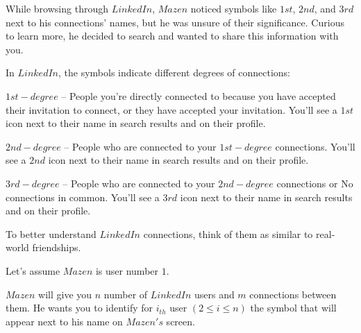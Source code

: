 While browsing through $LinkedIn$, $Mazen$ noticed symbols like $1st$, $2nd$, and $3rd$ next to his connections' names, but he was unsure of their significance. Curious to learn more, he decided to search and wanted to share this information with you.

In $LinkedIn$, the symbols indicate different degrees of connections:

$1st-degree$ -- People you're directly connected to because you have accepted their invitation to connect, or they have accepted your invitation. You'll see a $1st$ icon next to their name in search results and on their profile.

$2nd-degree$ -- People who are connected to your $1st-degree$ connections. You'll see a $2nd$ icon next to their name in search results and on their profile.

$3rd-degree$ -- People who are connected to your $2nd-degree$ connections or No connections in common. You'll see a $3rd$ icon next to their name in search results and on their profile.

To better understand $LinkedIn$ connections, think of them as similar to real-world friendships.

Let's assume $Mazen$ is user number $1$.

$Mazen$ will give you $n$ number of $LinkedIn$ users and $m$ connections between them.
He wants you to identify for $i_{th}$ user $(2 \le i \le n)$ the symbol that will appear next to his name on $Mazen's$ screen.